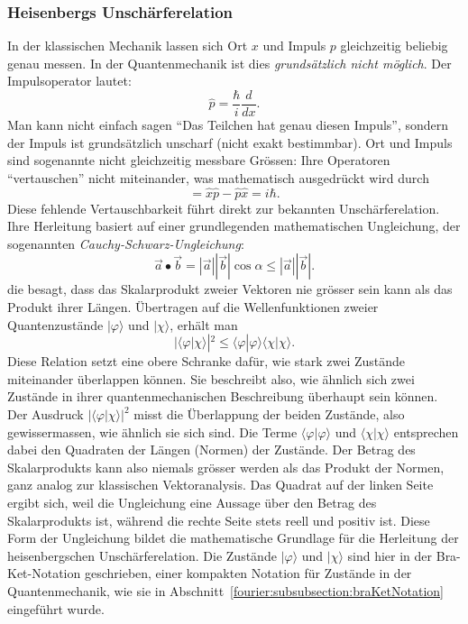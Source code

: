 	\subsubsection{Heisenbergs Unschärferelation%
	\label{fourier:subsubsection:unschaerferelation}}
		In der klassischen Mechanik lassen sich Ort $x$ und Impuls $p$ gleichzeitig beliebig genau messen.
		In der Quantenmechanik ist dies \emph{grundsätzlich nicht möglich}.
		Der Impulsoperator lautet:
		\begin{equation}
			\hat{p} = \frac{\hbar}{i} \frac{d}{dx}.
		\end{equation}
		Man kann nicht einfach sagen ``Das Teilchen hat genau diesen Impuls'', sondern der Impuls ist grundsätzlich unscharf (nicht exakt bestimmbar).
		Ort und Impuls sind sogenannte nicht gleichzeitig messbare Grössen:
		Ihre Operatoren ``vertauschen'' nicht miteinander, was mathematisch ausgedrückt wird durch
		\begin{equation}
			[\hat{x},\hat{p}] = \hat{x} \hat{p} - \hat{p} \hat{x} = i \hbar.
		\end{equation}
		Diese fehlende Vertauschbarkeit führt direkt zur bekannten Unschärferelation.
		Ihre Herleitung basiert auf einer grundlegenden mathematischen Ungleichung, der sogenannten \emph{Cauchy-Schwarz-Ungleichung}:
		\begin{equation}\label{fourier:equation:CauchySchwarzUngleichung}
			\vec{a} \bullet \vec{b} = |\vec{a}| |\vec{b}|\cos\alpha \le |\vec{a}| |\vec{b}|.
		\end{equation}
		die besagt, dass das Skalarprodukt zweier Vektoren nie grösser sein kann als das Produkt ihrer Längen.
		Übertragen auf die Wellenfunktionen zweier Quantenzustände $|\varphi\rangle$ und $|\chi\rangle$, erhält man
		\begin{equation}
			|\langle\varphi | \chi\rangle|^2 \le \langle\varphi | \varphi\rangle \langle\chi | \chi\rangle.
		\end{equation}
		Diese Relation setzt eine obere Schranke dafür, wie stark zwei Zustände miteinander überlappen können.
		Sie beschreibt also, wie ähnlich sich zwei Zustände in ihrer quantenmechanischen Beschreibung überhaupt sein können.
		Der Ausdruck $|\langle\varphi|\chi\rangle|^2$ misst die Überlappung der beiden Zustände, also gewissermassen, wie ähnlich sie sich sind.
		Die Terme $\langle\varphi|\varphi\rangle$ und $\langle\chi|\chi\rangle$ entsprechen dabei den Quadraten der Längen (Normen) der Zustände.
		Der Betrag des Skalarprodukts kann also niemals grösser werden als das Produkt der Normen, ganz analog zur klassischen Vektoranalysis.
		Das Quadrat auf der linken Seite ergibt sich, weil die Ungleichung eine Aussage über den Betrag des Skalarprodukts ist, während die rechte Seite stets reell und positiv ist.
		Diese Form der Ungleichung bildet die mathematische Grundlage für die Herleitung der heisenbergschen Unschärferelation.
		Die Zustände $|\varphi\rangle$ und $|\chi\rangle$ sind hier in der Bra-Ket-Notation geschrieben, einer kompakten Notation für Zustände in der Quantenmechanik,
		wie sie in Abschnitt~\ref{fourier:subsubsection:braKetNotation} eingeführt wurde.

